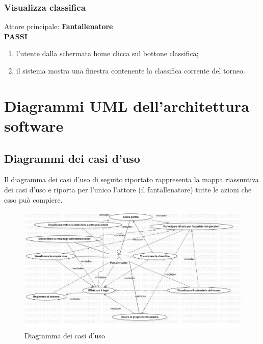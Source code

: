\documentclass[12pt,a4paper]{article}
\begin{document}
\subsubsection{Visualizza classifica}
Attore principale: \textbf{Fantallenatore}\\
\newline
\textbf{PASSI}
\begin{enumerate}
\item l'utente dalla schermata home clicca sul bottone classifica;
\item il sistema mostra una finestra contenente la classifica corrente del torneo.
\end{enumerate}
\newpage
\section{Diagrammi UML dell'architettura software}
\subsection{Diagrammi dei casi d'uso}
Il diagramma dei casi d'uso di seguito riportato rappresenta la mappa riassuntiva dei casi d'uso  e riporta per l'unico l'attore (il fantallenatore) tutte le azioni che esso può compiere.
\begin{figure}[h]
\centering
\includegraphics[width=15 cm,keepaspectratio]{diagrammaCasiUso.jpg}
\caption{Diagramma dei casi d'uso}
\end{figure}
\end{document}

